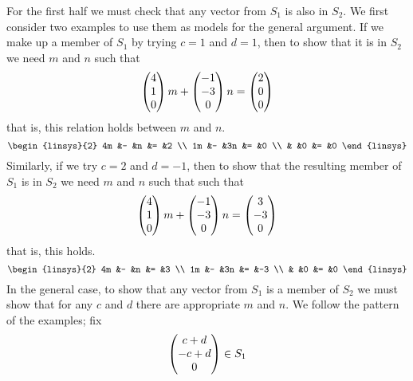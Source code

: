 \begin{example}
For the first half we must check that any vector
from \( S_1 \) is also in \( S_2 \).
We first consider two examples to use them as models for the general argument.
If we make up a member of $S_1$ by trying \( c=1 \) and \( d=1 \),
then to show that it is in $S_2$ we need \( m \) and $n$ such that
\begin{equation*}
  \begin{pmatrix} 4 \\ 1 \\ 0 \end{pmatrix}m
  +\begin{pmatrix} -1 \\ -3 \\ 0 \end{pmatrix}n
  =\begin{pmatrix} 2 \\ 0 \\ 0 \end{pmatrix}
\end{equation*}
that is, this relation holds between $m$ and $n$.
\begin{equation*}
  \begin{linsys}{2}
    4m  &-  &n  &=  &2  \\
    1m  &-  &3n &=  &0  \\
        &   &0  &=  &0 
  \end{linsys}  
\end{equation*}
Similarly,
if we try \( c=2 \) and \( d=-1 \), then to show that the resulting
member of $S_1$ is in $S_2$ we need \( m \) and $n$ such that
such that 
\begin{equation*}
  \begin{pmatrix} 4 \\ 1 \\ 0 \end{pmatrix}m
  +\begin{pmatrix} -1 \\ -3 \\ 0 \end{pmatrix}n
  =\begin{pmatrix} 3 \\ -3 \\ 0 \end{pmatrix}
\end{equation*}
that is, this holds.
\begin{equation*}
  \begin{linsys}{2}
    4m  &-  &n  &=  &3  \\
    1m  &-  &3n &=  &-3 \\
        &   &0  &=  &0 
   \end{linsys}
\end{equation*}
In the general case,
to show that any vector from \( S_1 \) is a member of \( S_2 \) we must show
that for any \( c \) and \( d \) there are appropriate \( m \) and \( n \).
We follow the pattern of the examples; fix
\begin{equation*}
  \begin{pmatrix} c+d \\ -c+d \\ 0 \end{pmatrix}\in S_1
\end{equation*}

\end{example}
